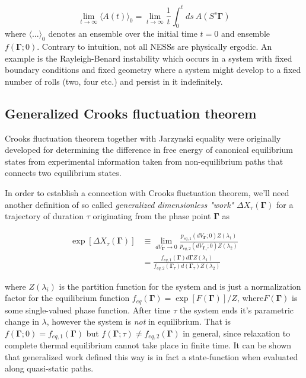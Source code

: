 \documentclass[a4paper,12pt]{article}
\begin{document}
\begin{equation}
      \lim_{t \to \infty} \langle A(t) \rangle_0 = \lim_{t \to \infty} \frac{1}{t} \int_0^t ds\ A(S^s \bm{\Gamma})
\end{equation}
 where $\langle ... \rangle_0$ denotes an ensemble over the initial time $t=0$ and ensemble $f(\bm{\Gamma};0)$.
Contrary to intuition, not all NESSs are physically ergodic. An example is the Rayleigh-Benard instability which occurs in a system with fixed boundary conditions and fixed geometry where a system might develop to a fixed number of rolls (two, four etc.) and persist in it indefinitely\cite{Evans:2241458}.
\subsection{Generalized Crooks fluctuation theorem}

Crooks fluctuation theorem together with Jarzynski equality were originally developed for determining the difference in free energy of canonical equilibrium states from experimental information taken from non-equilibrium paths that connects two equilibrium states. 

In order to establish a connection with Crooks fluctuation theorem, we'll need another definition of so called \textit{generalized dimensionless "work"} $\Delta X_{\tau}(\bm{\Gamma})$ for a trajectory of duration $\tau$ originating from the phase point $\bm{\Gamma}$ as

\begin{equation}
\begin{aligned}
\label{GeneralizedWorkDef}
  \exp[\Delta X_{\tau}(\bm{\Gamma})] &\equiv \lim_{d V_{\bm{\Gamma}} \to 0} \frac{p_{eq,1} (d V_{\bm{\Gamma}};0)Z(\lambda_1)}{p_{eq,2} (d V_{\bm{\Gamma}_{\tau}};0)Z(\lambda_2)} \\
  &= \frac{f_{eq,1}(\bm{\Gamma}) d\bm{\Gamma} Z(\lambda_1)}{f_{eq,2}(\bm{\Gamma}_{\tau}) d(\bm{\Gamma}_{\tau}) Z(\lambda_2)}
\end{aligned}
\end{equation}

where $Z(\lambda_i)$ is the partition function for the system and is just a normalization factor for the equilibrium function $f_{eq}(\bm{\Gamma}) =\exp[F(\bm{\Gamma})]/Z$, where$F(\bm{\Gamma})$ is some single-valued phase function. After time $\tau$ the system ends it's parametric change in $\lambda$, however the system is \textit{not} in equilibrium. That is $f(\bm{\Gamma};0)=f_{eq,1}(\bm{\Gamma})$ but $f(\bm{\Gamma};\tau)\neq f_{eq,2}(\bm{\Gamma})$ in general, since relaxation to complete thermal equilibrium cannot take place in finite time.
It can be shown that generalized work defined this way is in fact a state-function when evaluated along quasi-static paths.
\end{document}
